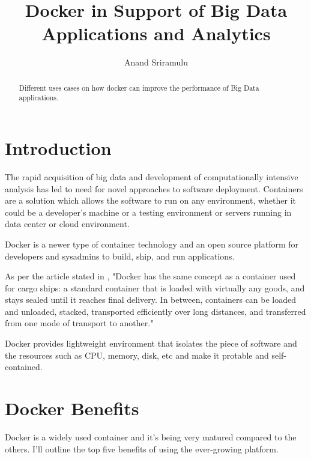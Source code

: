 \documentclass[sigconf]{acmart}
\begin{document}
	\title {Docker in Support of Big Data Applications and Analytics}
	
	
	\author{Anand Sriramulu}
	
	
	\renewcommand{\shortauthors}{Anand S}
	
	
	\begin{abstract}
		Different uses cases on how docker can improve the performance of Big Data applications.
	\end{abstract}
	
	
	\maketitle
	
	\section{Introduction}
	The rapid acquisition of big data and development of computationally intensive analysis has led to need for novel approaches to software deployment. Containers are a solution which allows the software to run on any environment, whether it could be a developer's machine or a testing environment or servers running in data center or cloud environment.  
	
	Docker is a newer type of container technology and an open source platform for developers and sysadmins to build, ship, and run applications.
	
	As per the article stated in \cite{AboutDocker}, "Docker has the same concept as a container used for cargo ships: a standard container that is loaded with virtually any goods, and stays sealed until it reaches final delivery. In between, containers can be loaded and unloaded, stacked, transported efficiently over long distances, and transferred from one mode of transport to another."
	
	Docker provides lightweight environment that isolates the piece of software and the resources such as CPU, memory, disk, etc and make it protable and self-contained.			
	
	\section{Docker Benefits}
	Docker is a widely used container and it's being very matured compared to the others. I'll outline the top five benefits of using the ever-growing platform. \cite{DockerBenefits}
\end{document}
